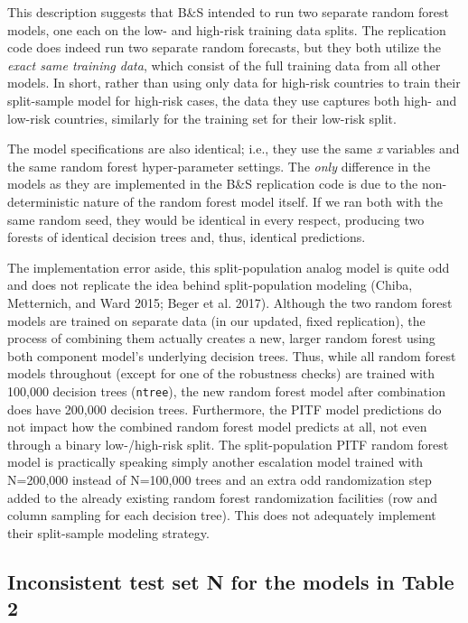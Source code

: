 \documentclass[
]{article}
\begin{document}
This description suggests that B\&S intended to run two separate random forest models, one each on the low- and high-risk training data splits. The replication code does indeed run two separate random forecasts, but they both utilize the \emph{exact same training data}, which consist of the full training data from all other models. In short, rather than using only data for high-risk countries to train their split-sample model for high-risk cases, the data they use captures both high- and low-risk countries, similarly for the training set for their low-risk split.

The model specifications are also identical; i.e., they use the same \emph{x} variables and the same random forest hyper-parameter settings. The \emph{only} difference in the models as they are implemented in the B\&S replication code is due to the non-deterministic nature of the random forest model itself. If we ran both with the same random seed, they would be identical in every respect, producing two forests of identical decision trees and, thus, identical predictions.

The implementation error aside, this split-population analog model is quite odd and does not replicate the idea behind split-population modeling (Chiba, Metternich, and Ward 2015; Beger et al. 2017). Although the two random forest models are trained on separate data (in our updated, fixed replication), the process of combining them actually creates a new, larger random forest using both component model's underlying decision trees. Thus, while all random forest models throughout (except for one of the robustness checks) are trained with 100,000 decision trees (\texttt{ntree}), the new random forest model after combination does have 200,000 decision trees. Furthermore, the PITF model predictions do not impact how the combined random forest model predicts at all, not even through a binary low-/high-risk split. The split-population PITF random forest model is practically speaking simply another escalation model trained with N=200,000 instead of N=100,000 trees and an extra odd randomization step added to the already existing random forest randomization facilities (row and column sampling for each decision tree). This does not adequately implement their split-sample modeling strategy.

\hypertarget{inconsistent-test-set-n-for-the-models-in-table-2}{%
\subsection{Inconsistent test set N for the models in Table 2}\label{inconsistent-test-set-n-for-the-models-in-table-2}}
\end{document}
